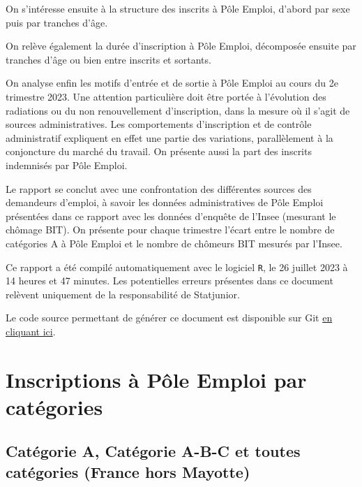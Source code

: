 \documentclass[
  paper=a4,
  ,captions=tableheading
]{scrartcl}
\begin{document}
On s'intéresse ensuite à la structure des inscrits à Pôle Emploi,
d'abord par sexe puis par tranches d'âge.

On relève également la durée d'inscription à Pôle Emploi, décomposée
ensuite par tranches d'âge ou bien entre inscrits et sortants.

On analyse enfin les motifs d'entrée et de sortie à Pôle Emploi au cours
du 2e trimestre 2023. Une attention particulière doit être portée à
l'évolution des radiations ou du non renouvellement d'inscription, dans
la mesure où il s'agit de sources administratives. Les comportements
d'inscription et de contrôle administratif expliquent en effet une
partie des variations, parallèlement à la conjoncture du marché du
travail. On présente aussi la part des inscrits indemnisés par Pôle
Emploi.

Le rapport se conclut avec une confrontation des différentes sources des
demandeurs d'emploi, à savoir les données administratives de Pôle Emploi
présentées dans ce rapport avec les données d'enquête de l'Insee
(mesurant le chômage BIT). On présente pour chaque trimestre l'écart
entre le nombre de catégories A à Pôle Emploi et le nombre de chômeurs
BIT mesurés par l'Insee.

Ce rapport a été compilé automatiquement avec le logiciel \texttt{R}, le
26 juillet 2023 à 14 heures et 47 minutes. Les potentielles erreurs
présentes dans ce document relèvent uniquement de la responsabilité de
Statjunior.

Le code source permettant de générer ce document est disponible sur Git
\href{https://github.com/statjunior/Statjunior/tree/main/Demandeurs\%20d\textquotesingle{}emploi\%20(Pole\%20Emploi)/}{en
cliquant ici}.

\hypertarget{inscriptions-uxe0-puxf4le-emploi-par-catuxe9gories}{%
\section{Inscriptions à Pôle Emploi par
catégories}\label{inscriptions-uxe0-puxf4le-emploi-par-catuxe9gories}}

\hypertarget{catuxe9gorie-a-catuxe9gorie-a-b-c-et-toutes-catuxe9gories-france-hors-mayotte}{%
\subsection{Catégorie A, Catégorie A-B-C et toutes catégories (France
hors
Mayotte)}\label{catuxe9gorie-a-catuxe9gorie-a-b-c-et-toutes-catuxe9gories-france-hors-mayotte}}
\end{document}
